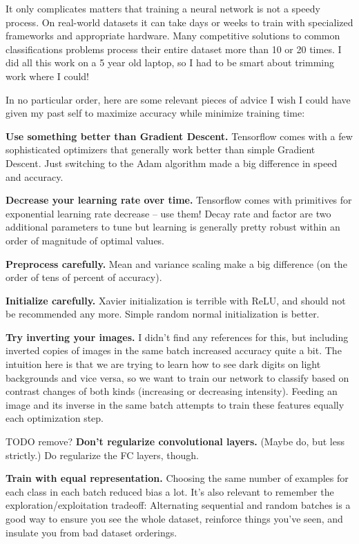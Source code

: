 \documentclass{article}
\begin{document}
It only complicates matters that training a neural network is not a speedy process. On real-world datasets it can take days or weeks to train with specialized frameworks and appropriate hardware. Many competitive solutions to common classifications problems process their entire dataset more than 10 or 20 times. I did all this work on a 5 year old laptop, so I had to be smart about trimming work where I could!

In no particular order, here are some relevant pieces of advice I wish I could have given my past self to maximize accuracy while minimize training time:

\textbf{Use something better than Gradient Descent.} Tensorflow comes with a few sophisticated optimizers that generally work better than simple Gradient Descent. Just switching to the Adam algorithm made a big difference in speed and accuracy.

\textbf{Decrease your learning rate over time.} Tensorflow comes with primitives for exponential learning rate decrease -- use them! Decay rate and factor are two additional parameters to tune but learning is generally pretty robust within an order of magnitude of optimal values.

\textbf{Preprocess carefully.} Mean and variance scaling make a big difference (on the order of tens of percent of accuracy).

\textbf{Initialize carefully.} Xavier initialization is terrible with ReLU, and should not be recommended any more. Simple random normal initialization is better.

\textbf{Try inverting your images.} I didn't find any references for this, but including inverted copies of images in the same batch increased accuracy quite a bit. The intuition here is that we are trying to learn how to see dark digits on light backgrounds and vice versa, so we want to train our network to classify based on contrast changes of both kinds (increasing or decreasing intensity). Feeding an image and its inverse in the same batch attempts to train these features equally each optimization step.

TODO remove?
\textbf{Don't regularize convolutional layers.}  (Maybe do, but less strictly.) Do regularize the FC layers, though.

\textbf{Train with equal representation.} Choosing the same number of examples for each class in each batch reduced bias a lot.  It's also relevant to remember the exploration/exploitation tradeoff: Alternating sequential and random batches is a good way to ensure you see the whole dataset, reinforce things you've seen, and insulate you from bad dataset orderings.
\end{document}
